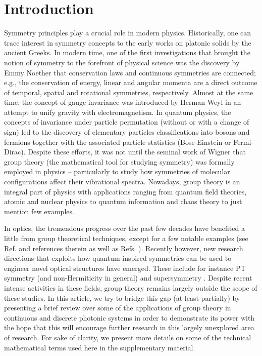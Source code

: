 \documentclass[12pt]{iopart}
\begin{document}
\section{Introduction}
Symmetry principles play a crucial role in modern physics. Historically, one can trace interest in symmetry concepts to the early works on platonic solids by the ancient Greeks. In modern time, one of the first investigations that brought the notion of symmetry to the forefront of physical science was the discovery by Emmy Noether \cite{Noether1918p235} that conservation laws and continuous symmetries are connected; e.g., the conservation of energy, linear and angular momenta are a direct outcome of temporal, spatial and rotational symmetries, respectively. Almost at the same time, the concept of gauge invariance was introduced by Herman Weyl in an attempt to unify gravity with electromagnetism. In quantum physics, the concepts of invariance under particle permutation (without or with a change of sign) led to the discovery of elementary particles classifications into bosons and fermions together with the associated particle statistics (Bose-Einstein or Fermi-Dirac). Despite these efforts, it was not until the seminal work of Wigner that group theory (the mathematical tool for studying symmetry) was formally employed in physics – particularly to study how symmetries of molecular configurations affect their vibrational spectra. Nowadays, group theory is an integral part of physics with applications ranging from quantum field theories, atomic and nuclear physics to quantum information and chaos theory to just mention few examples.

In optics, the tremendous progress over the past few decades have benefited a little from group theoretical techniques, except for a few notable examples (see Ref. \cite{Wolfbook} and references therein as well as  Refs. \cite{Khan,Vance,Vance2, PBG, RJLR}). Recently however, new research directions that exploits how quantum-inspired symmetries can be used to engineer novel optical structures have emerged. These include for instance PT symmetry (and non-Hermiticity in general) \cite{Bender1,CPA,CPALaser,Constant_Intensity,EP_PRL,EP_exp,El-Ganainy_OL07,Feng2,Guo,Hodaei,Kostas_Anamolous,Kottos_RLC,Lin,Musslimani_prl08,RE_EPs,RE_Nonlinear,RE_Optomechanic,Rotter_EP,phonon_laser,Yang,Makris_prl08,Longhi,Loss,Ruter, Walk,Schomerus1,Schomerus2,Wiersig,Teimourpour, Xiao, Schomerus_PTLaser} and supersymmetry \cite{Cooper,Wolf,BML_SUSY, SUSY_scattering, Miri_SUSY,Longhi_SUSY,RE_SUSY1,RE_SUSY2,RE_SUSY3,RE_SUSY4,Park_SUSY,RE_SUSY5}. Despite recent intense activities in these fields, group theory remains largely outside the scope of these studies.
In this article, we try to bridge this gap (at least partially) by presenting a brief review over some of the applications of group theory in continuous and discrete photonic systems in order to demonstrate its power with the hope that this will encourage further research in this largely unexplored area of research. For sake of clarity, we present more details on some of the technical mathematical terms used here in the supplementary material. 
\end{document}
